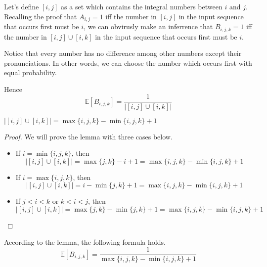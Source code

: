 Let's define $[i, j]$ as a set which contains the integral numbers between $i$ and $j$.
Recalling the proof that $A_{i, j} = 1$ iff the number in $[i, j]$ in the input sequence that occurs first must be $i$, we can obvirusly make an inferrence that $B_{i, j, k} = 1$ iff the number in $[i, j] \cup [i, k]$ in the input sequence that occurs first must be $i$.

Notice that every number has no difference among other numbers except their pronunciations. In other words, we can choose the number which occurs first with equal probability.

Hence
\[\mathbb{E}[B_{i, j, k}] = \dfrac{1}{\left|[i, j] \cup [i, k]\right|}\]

\begin{lemma}
$\left|[i, j] \cup [i, k]\right| = \max\{i, j, k\} - \min\{i, j, k\} + 1$
\end{lemma}
\begin{proof}
We will prove the lemma with three cases below.
\begin{itemize}
\item If $i = \min\{i, j, k\}$, then
\[\left|[i, j] \cup [i, k]\right| = \max\{j, k\} - i + 1 = \max\{i, j, k\} - \min\{i, j, k\} + 1\]
\item If $i = \max\{i, j, k\}$, then
\[\left|[i, j] \cup [i, k]\right| = i - \min\{j, k\} + 1 = \max\{i, j, k\} - \min\{i, j, k\} + 1\]
\item If $j < i < k$ or $k < i < j$, then
\[\left|[i, j] \cup [i, k]\right| = \max\{j, k\} - \min\{j, k\} + 1 = \max\{i, j, k\} - \min\{i, j, k\} + 1\]
\end{itemize}
\end{proof}

According to the lemma, the following formula holds.
\[\mathbb{E}[B_{i, j, k}] = \dfrac{1}{\max\{i, j, k\} - \min\{i, j, k\} + 1}\]
